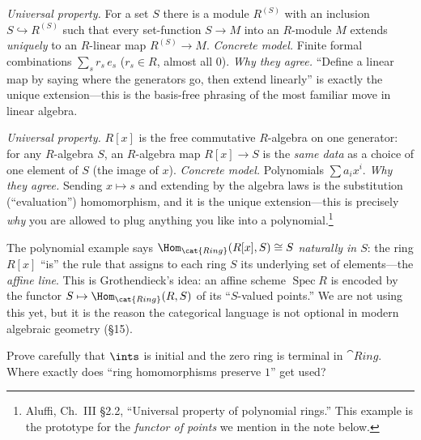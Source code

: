 \documentclass[11pt]{article}
\DeclareMathOperator{\Spec}{Spec}
\begin{document}
\begin{eexample}
\emph{Universal property.} For a set $S$ there is a module $R^{(S)}$ with an inclusion
$S\hookrightarrow R^{(S)}$ such that every set-function $S\to M$ into an $R$-module $M$
extends \emph{uniquely} to an $R$-linear map $R^{(S)}\to M$. \emph{Concrete model.} Finite
formal combinations $\sum_{s} r_s\, e_s$ ($r_s\in R$, almost all $0$). \emph{Why they agree.}
``Define a linear map by saying where the generators go, then extend linearly'' is exactly
the unique extension---this is the basis-free phrasing of the most familiar move in linear
algebra.
\end{eexample}

\begin{eexample}
\emph{Universal property.} $R[x]$ is the free commutative $R$-algebra on one generator: for
any $R$-algebra $S$, an $R$-algebra map $R[x]\to S$ is the \emph{same data} as a choice of
one element of $S$ (the image of $x$). \emph{Concrete model.} Polynomials $\sum a_i x^i$.
\emph{Why they agree.} Sending $x\mapsto s$ and extending by the algebra laws is the
substitution (``evaluation'') homomorphism, and it is the unique extension---this is precisely
\emph{why} you are allowed to plug anything you like into a polynomial.\footnote{Aluffi,
Ch.~III \S2.2, ``Universal property of polynomial rings.'' This example is the prototype for
the \emph{functor of points} we mention in the note below.}
\end{eexample}

\begin{nnote}
The polynomial example says $\Hom_{\cat{Ring}}(R[x],S)\cong S$ \emph{naturally in $S$}: the
ring $R[x]$ ``is'' the rule that assigns to each ring $S$ its underlying set of elements---the
\emph{affine line}. This is Grothendieck's  idea: an affine scheme
$\Spec R$ is encoded by the functor $S\mapsto\Hom_{\cat{Ring}}(R,S)$ of its ``$S$-valued
points.'' We are not using this yet, but it is the reason the categorical language is not
optional in modern algebraic geometry (\S15).
\end{nnote}

\begin{xca}
Prove carefully that $\ints$ is initial and the zero ring is terminal in $\cat{Ring}$. Where
exactly does ``ring homomorphisms preserve $1$'' get used?
\end{xca}
\end{document}
